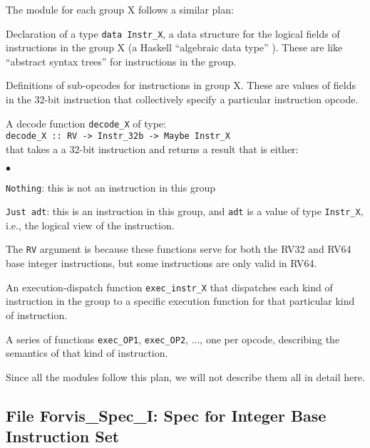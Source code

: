 \documentclass[11pt]{article}
\newcommand{\hmm}{\hspace*{2em}}
\newenvironment{tightlist}%
{\begin{list}{$\bullet$}{%
    \setlength{\topsep}{0in}
    \setlength{\partopsep}{0in}
    \setlength{\itemsep}{0in}
    \setlength{\parsep}{0in}
    \setlength{\leftmargin}{1.5em}
    \setlength{\rightmargin}{0in}
    \setlength{\itemindent}{0in}
}
}%
{\end{list}
}
\begin{document}
The module for each group X follows a similar plan:
\begin{itemize}

\item Declaration of a type \verb|data Instr_X|, a data structure for
the logical fields of instructions in the group X (a Haskell
``algebraic data type'' ).  These are like ``abstract syntax trees''
for instructions in the group.

\item Definitions of sub-opcodes for instructions in group X.  These
are values of fields in the 32-bit instruction that collectively
specify a particular instruction opcode.

\item A decode function \verb|decode_X| of type: \\
\hmm \verb|decode_X :: RV -> Instr_32b -> Maybe Instr_X| \\
that takes a a 32-bit instruction and returns a result that is either:
  \begin{tightlist}

    \item \verb|Nothing|: this is not an instruction in this group

    \item \verb|Just adt|: this is an instruction in this group, and
    \verb|adt| is a value of type \verb|Instr_X|, i.e., the logical
    view of the instruction.

  \end{tightlist}
  The \verb|RV| argument is because these functions serve for both the
  RV32 and RV64 base integer instructions, but some instructions are
  only valid in RV64.

\item An execution-dispatch function \verb|exec_instr_X| that
dispatches each kind of instruction in the group to a specific
execution function for that particular kind of instruction.

\item A series of functions \verb|exec_OP1|, \verb|exec_OP2|, ..., one per opcode, describing
the semantics of that kind of instruction.

\end{itemize}

Since all the modules follow this plan, we will not describe them all in detail here.


\subsection{File Forvis\_Spec\_I: Spec for Integer Base Instruction Set}
\end{document}
